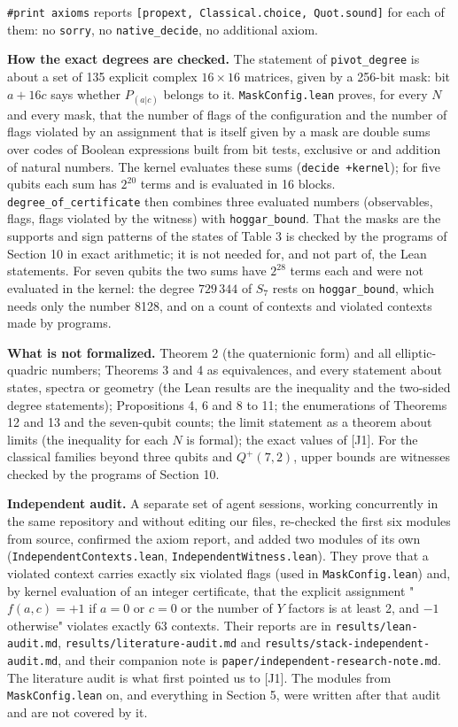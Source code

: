 \documentclass[11pt,a4paper]{article}
\begin{document}
\texttt{\#print\ axioms} reports \texttt{{[}propext,\ Classical.choice,\ Quot.sound{]}} for each of them: no \texttt{sorry}, no
\texttt{native\_decide}, no additional axiom.

\textbf{How the exact degrees are checked.} The statement of \texttt{pivot\_degree} is about a set of 135 explicit
complex \(16 \times 16\) matrices, given by a 256-bit mask: bit \(a + 16c\) says whether \(P_{(a|c)}\) belongs to
it. \texttt{MaskConfig.lean} proves, for every \(N\) and every mask, that the number of flags of the configuration
and the number of flags violated by an assignment that is itself given by a mask are double sums over
codes of Boolean expressions built from bit tests, exclusive or and addition of natural numbers. The
kernel evaluates these sums (\texttt{decide\ +kernel}); for five qubits each sum has \(2^{20}\) terms and is
evaluated in 16 blocks. \texttt{degree\_of\_certificate} then combines three evaluated numbers (observables,
flags, flags violated by the witness) with \texttt{hoggar\_bound}. That the masks are the supports and sign
patterns of the states of Table 3 is checked by the programs of Section 10 in exact arithmetic; it is
not needed for, and not part of, the Lean statements. For seven qubits the two sums have \(2^{28}\) terms
each and were not evaluated in the kernel: the degree \(729\,344\) of \(S_7\) rests on \texttt{hoggar\_bound}, which
needs only the number 8128, and on a count of contexts and violated contexts made by programs.

\textbf{What is not formalized.} Theorem 2 (the quaternionic form) and all elliptic-quadric numbers;
Theorems 3 and 4 as equivalences, and every statement about states, spectra or geometry (the Lean
results are the inequality and the two-sided degree statements); Propositions 4, 6 and 8 to 11; the
enumerations of Theorems 12 and 13 and the seven-qubit counts; the limit
statement as a theorem about limits (the inequality for each \(N\) is formal); the exact values of {[}J1{]}.
For the classical families beyond three qubits and \(Q^+(7,2)\), upper bounds are witnesses checked by
the programs of Section 10.

\textbf{Independent audit.} A separate set of agent sessions, working concurrently in the same repository
and without editing our files, re-checked the first six modules from source, confirmed the axiom
report, and added two modules of its own (\texttt{IndependentContexts.lean}, \texttt{IndependentWitness.lean}). They
prove that a violated context carries exactly six violated flags (used in \texttt{MaskConfig.lean}) and, by
kernel evaluation of an integer certificate, that the explicit assignment
"\(f(a,c) = +1\) if \(a = 0\) or \(c = 0\) or the number of \(Y\) factors is at least 2, and \(-1\) otherwise"
violates exactly 63 contexts. Their reports are in \texttt{results/lean-audit.md},
\texttt{results/literature-audit.md} and \texttt{results/stack-independent-audit.md}, and their companion note is
\texttt{paper/independent-research-note.md}. The literature audit is what first pointed us to {[}J1{]}. The
modules from \texttt{MaskConfig.lean} on, and everything in Section 5, were written after that audit and are
not covered by it.
\end{document}
